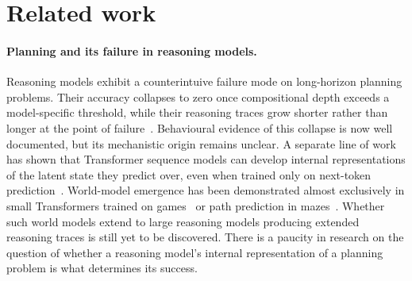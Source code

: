 \documentclass{article} %
\begin{document}

\section{Related work}
\label{sec:related-work}

\paragraph{Planning and its failure in reasoning models.}
Reasoning models exhibit a counterintuive failure mode on long-horizon planning problems. Their accuracy collapses to zero once compositional depth exceeds a model-specific threshold, while their reasoning traces grow shorter rather than longer at the point of failure~\citep{shojaee2025illusion}. Behavioural evidence of this collapse is now well documented, but its mechanistic origin remains unclear. A separate line of work has shown that Transformer sequence models can develop internal representations of the latent state they predict over, even when trained only on next-token prediction~\citep{li2022emergent, toshniwal2022chess}. World-model emergence has been demonstrated almost exclusively in small Transformers trained on games~\citep{li2022emergent, toshniwal2022chess} or path prediction in mazes~\citep{spies2025transformers}. Whether such world models extend to large reasoning models producing extended reasoning traces is still yet to be discovered. There is a paucity in research on the question of whether a reasoning model's internal representation of a planning problem is what determines its success.
\end{document}
